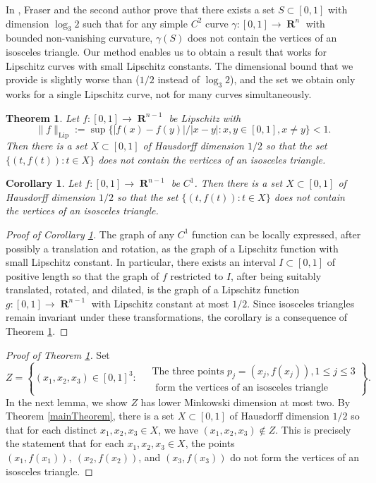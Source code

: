 \documentclass[dvipsnames,letterpaper,12pt]{article}
\numberwithin{equation}{section}
\theoremstyle{plain}
\newtheorem{theorem}{Theorem}
\newtheorem{corollary}{Corollary}
\theoremstyle{remark}
\DeclareMathOperator{\RR}{\mathbf{R}}
\DeclareMathOperator{\setcolon}{\colon}
\begin{document}
In \cite{MalabikaRob}, Fraser and the second author prove that there exists a set $S \subset [0,1]$ with dimension $\log_3 2$ such that for any simple $C^2$ curve $\gamma \colon [0,1] \to \RR^n$ with bounded non-vanishing curvature, $\gamma(S)$ does not contain the vertices of an isosceles triangle. Our method enables us to obtain a result that works for Lipschitz curves with small Lipschitz constants. The dimensional bound that we provide is slightly worse than \cite{MalabikaRob} ($1/2$ instead of $\log_3 2$), and the set we obtain only works for a single Lipschitz curve, not for many curves simultaneously.

\begin{theorem}\label{C1IsoscelesThm}
	Let $f\colon [0,1] \to \RR^{n-1}$ be Lipschitz with \[ \| f \|_{\text{Lip}}  := \sup \bigl\{|f(x) - f(y)|/|x-y| : x, y \in [0,1], x \ne y   \bigr\} < 1. \]  Then there is a set $X \subset [0,1]$ of Hausdorff dimension $1/2$ so that the set $\{(t,f(t)) \setcolon t\in X\}$ does not contain the vertices of an isosceles triangle.
\end{theorem}

\begin{corollary}
\label{C1IsoscelesCor}
Let $f\colon [0,1] \to \RR^{n-1}$ be $C^1$.  Then there is a set $X \subset [0,1]$ of Hausdorff dimension $1/2$ so that the set $\{(t,f(t)) \setcolon t\in X\}$ does not contain the vertices of an isosceles triangle.
\end{corollary} 
\begin{proof}[Proof of Corollary \ref{C1IsoscelesCor}]
The graph of any $C^1$ function can be locally expressed, after possibly a translation and rotation, as the graph of a Lipschitz function with small Lipschitz constant. In particular, there exists an interval $I\subset[0,1]$ of positive length so that the graph of $f$ restricted to $I$, after being suitably translated, rotated, and dilated, is the graph of a Lipschitz function $g\colon [0,1] \to \RR^{n-1}$ with Lipschitz constant at most $1/2$. Since isosceles triangles remain invariant under these transformations, the corollary is a consequence of Theorem \ref{C1IsoscelesThm}.  
\end{proof} 

\begin{proof}[Proof of Theorem \ref{C1IsoscelesThm}]
	Set
	\begin{equation} \label{def-Z} Z = \left\{ (x_1,x_2,x_3) \in [0,1]^3 \setcolon \; \begin{aligned} &{\text{The three points }} p_j = (x_j,f(x_j)), 1 \leq j \leq 3 \\  &\text{ form the vertices of an isosceles triangle} \end{aligned} \right\}. \end{equation} 
	In the next lemma, we show $Z$ has lower Minkowski dimension at most two. By Theorem \ref{mainTheorem}, there is a set $X \subset[0,1]$ of Hausdorff dimension $1/2$ so that for each distinct $x_1,x_2,x_3\in X$, we have $(x_1,x_2,x_3)\not\in Z$. This is precisely the statement that for each $x_1,x_2,x_3\in X$, the points $(x_1,f(x_1)),\ (x_2,f(x_2))$, and $(x_3,f(x_3))$ do not form the vertices of an isosceles triangle. 
\end{proof}
\end{document}
